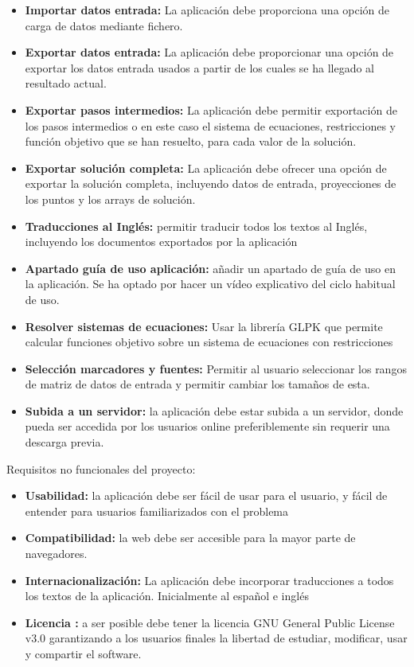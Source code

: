 \begin{itemize}
    \item \textbf{Importar datos entrada:} La aplicación debe proporciona una opción de carga de datos mediante fichero.
    \item \textbf{Exportar datos entrada:} La aplicación debe proporcionar una opción de exportar los datos entrada usados a partir de los cuales se ha llegado al resultado actual.
    \item \textbf{Exportar pasos intermedios:} La aplicación debe permitir exportación de los pasos intermedios o en este caso el sistema de ecuaciones, restricciones y función objetivo que se han resuelto, para cada valor de la solución.
    \item \textbf{Exportar solución completa:} La aplicación debe ofrecer una opción de exportar la solución completa, incluyendo datos de entrada, proyecciones de los puntos y los arrays de solución.
    \item \textbf{Traducciones al Inglés:} permitir traducir todos los textos al Inglés, incluyendo los documentos exportados por la aplicación
    \item \textbf{Apartado guía de uso aplicación:} añadir un apartado de guía de uso en la aplicación. Se ha optado por hacer un vídeo explicativo del ciclo habitual de uso.
    \item \textbf{Resolver sistemas de ecuaciones:} Usar la librería GLPK \cite{glpk:package} que permite calcular funciones objetivo sobre un sistema de ecuaciones con restricciones
    \item \textbf{Selección marcadores y fuentes:} Permitir al usuario seleccionar los rangos de matriz de datos de entrada y permitir cambiar los tamaños de esta. 
    \item \textbf{Subida a un servidor:} la aplicación debe estar subida a un servidor, donde pueda ser accedida por los usuarios online preferiblemente sin requerir una descarga previa.
\end{itemize}

Requisitos no funcionales del proyecto:

\begin{itemize}
    \item \textbf{Usabilidad: }la aplicación debe ser fácil de usar para el usuario, y fácil de entender para usuarios familiarizados con el problema  
    \item \textbf{Compatibilidad: }la web debe ser accesible para la mayor parte de navegadores. 
    \item \textbf{Internacionalización: } La aplicación debe incorporar traducciones a todos los textos  de la aplicación. Inicialmente al español e inglés
    \item \textbf{Licencia : }a ser posible debe tener la licencia GNU General Public License v3.0 garantizando a los usuarios finales la libertad de estudiar, modificar, usar y compartir el software.
\end{itemize}

